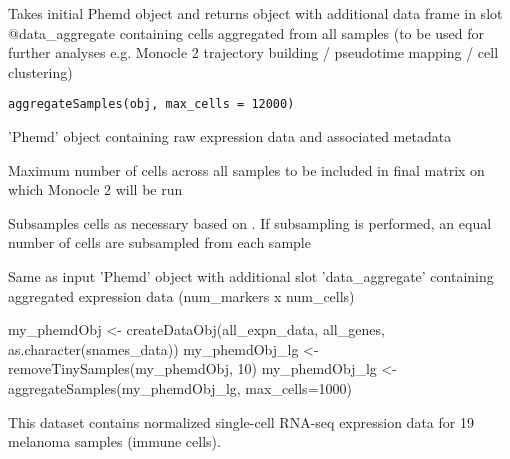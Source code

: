 \documentclass[a4paper]{book}
\begin{document}
%
\begin{Description}\relax
Takes initial Phemd object and returns object with additional data frame in slot @data\_aggregate containing cells aggregated from all samples (to be used for further analyses e.g. Monocle 2 trajectory building / pseudotime mapping / cell clustering)
\end{Description}
%
\begin{Usage}
\begin{verbatim}
aggregateSamples(obj, max_cells = 12000)
\end{verbatim}
\end{Usage}
%
\begin{Arguments}
\begin{ldescription}
\item[\code{obj}] 'Phemd' object containing raw expression data and associated metadata

\item[\code{max\_cells}] Maximum number of cells across all samples to be included in final matrix on which Monocle 2 will be run
\end{ldescription}
\end{Arguments}
%
\begin{Details}\relax
Subsamples cells as necessary based on . If subsampling is performed, an equal number of cells are subsampled from each sample
\end{Details}
%
\begin{Value}
Same as input 'Phemd' object with additional slot 'data\_aggregate' containing aggregated expression data (num\_markers x num\_cells)
\end{Value}
%
\begin{Examples}
\begin{ExampleCode}
my_phemdObj <- createDataObj(all_expn_data, all_genes, as.character(snames_data))
my_phemdObj_lg <- removeTinySamples(my_phemdObj, 10)
my_phemdObj_lg <- aggregateSamples(my_phemdObj_lg, max_cells=1000)

\end{ExampleCode}
\end{Examples}
%
\begin{Description}\relax
This dataset contains normalized single-cell RNA-seq expression data for 19 melanoma samples (immune cells).
\end{Description}
\end{document}
